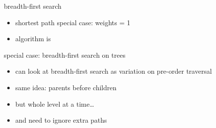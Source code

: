 \usetikzlibrary{graphs,graphs.standard,graphdrawing,quotes}

\begin{frame}{breadth-first search}
\begin{itemize}
\item shortest path special case: weights = 1
\item algorithm is 
\end{itemize}
\end{frame}

\begin{frame}{special case: breadth-first search on trees}
\begin{itemize}
\item can look at breadth-first search as variation on pre-order traversal
\item same idea: parents before children
\item but whole level at a time\ldots
\item and need to ignore extra paths
\end{itemize}
\end{frame}

